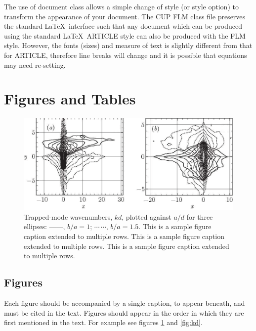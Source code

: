 \documentclass[lineno]{JFM-FLM_Au}
\begin{document}
The use of document class allows a simple change of style (or style option)
to transform the appearance of your document. The CUP FLM class file preserves
the standard LaTeX\ interface such that any document which can be produced
using the standard LaTeX\ ARTICLE style can also be produced with the
FLM style. However, the fonts (sizes) and measure of text is slightly different
from that for ARTICLE, therefore line breaks will change and it is possible
that equations may need re-setting.



\section{Figures and Tables}\label{sec:Figures_Tables}

\begin{figure}
  \centerline{\includegraphics{figs/Fig1}}%
  \caption{Trapped-mode wavenumbers, $kd$, plotted against $a/d$ for
    three ellipses: %
    ---$\!$---,
    $b/a=1$; $\cdots$\,$\cdots$, $b/a=1.5$. This is a sample figure caption extended to multiple rows. This is a sample figure caption extended to multiple rows. This is a sample figure caption extended to multiple rows.}
\label{fig:ka}
\end{figure}

\subsection{Figures}
 Each figure should be accompanied by a single caption, to appear beneath, and must be cited in the text. Figures should appear in the order in which they are first mentioned in the text. For example see figures \ref{fig:ka} and \ref{fig:kd}.
\end{document}
